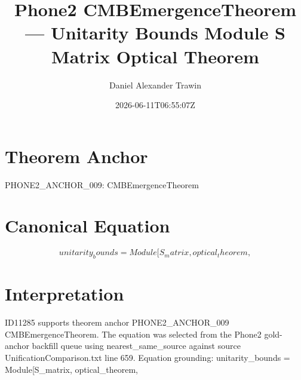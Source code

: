 \documentclass[11pt]{article}
\title{Phone2 CMBEmergenceTheorem — Unitarity Bounds Module S Matrix Optical Theorem}
\author{Daniel Alexander Trawin}
\date{2026-06-11T06:55:07Z}
\begin{document}
\maketitle
\section*{Theorem Anchor}
PHONE2_ANCHOR_009: CMBEmergenceTheorem
\section*{Canonical Equation}
\[
unitarity_bounds = Module[{S_matrix, optical_theorem},
\]
\section*{Interpretation}
ID11285 supports theorem anchor PHONE2_ANCHOR_009 CMBEmergenceTheorem. The equation was selected from the Phone2 gold-anchor backfill queue using nearest_same_source against source UnificationComparison.txt line 659. Equation grounding: unitarity_bounds = Module[{S_matrix, optical_theorem},
\end{document}
